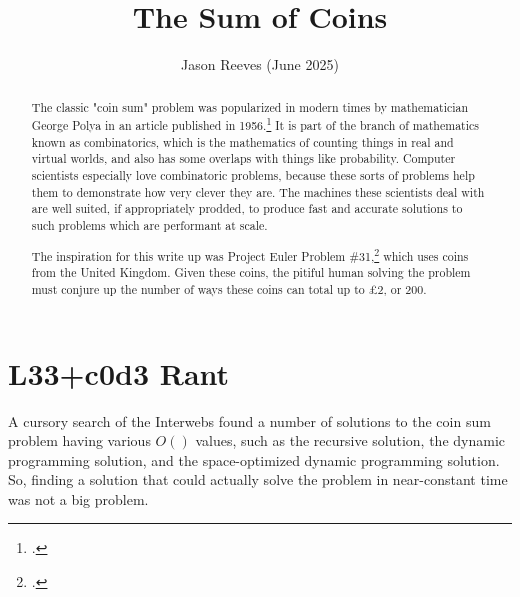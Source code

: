 

\usepackage{amsmath}
\usepackage{amssymb}
\usepackage{graphicx}
\usepackage[table]{xcolor}
\usepackage{diagbox}
\usepackage{listings}

\lstset{style=default}

\title{The Sum of Coins}
\author{Jason Reeves (June 2025)}
\date{}



\ifdefined\embedversion
  \pagestyle{empty}
\fi

\maketitle
{}

\begin{abstract}
The classic "coin sum" problem was popularized in modern times by mathematician George Polya in an article published in 1956.\footcite{polya}  It is part of the branch of mathematics known as combinatorics, which is the mathematics of counting things in real and virtual worlds, and also has some overlaps with things like probability.  Computer scientists especially love combinatoric problems, because these sorts of problems help them to demonstrate how very clever they are.  The machines these scientists deal with are well suited, if appropriately prodded, to produce fast and accurate solutions to such problems which are performant at scale.

The inspiration for this write up was Project Euler Problem \#31,\footcite{euler31} which uses coins from the United Kingdom.  Given these coins, the pitiful human solving the problem must conjure up the number of ways these coins can total up to \pounds2, or 200\textcent.
\end{abstract}

\ifdefined\embedversion\newpage\fi
\section{L33+c0d3 Rant}
A cursory search of the Interwebs found a number of solutions to the coin sum problem having various $O()$ values, such as the recursive solution, the dynamic programming solution, and the space-optimized dynamic programming solution.  So, finding a solution that could actually solve the problem in near-constant time was not a big problem.  

